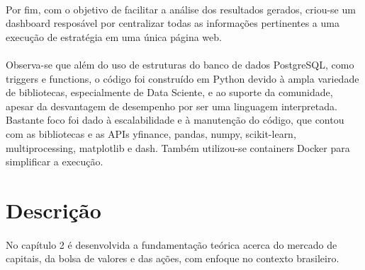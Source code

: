 \paragraph{} Por fim, com o objetivo de facilitar a análise dos resultados gerados, criou-se um dashboard resposável por centralizar todas as informações pertinentes a uma execução de estratégia em uma única página web.

\paragraph{} Observa-se que além do uso de estruturas do banco de dados PostgreSQL, como triggers e functions, o código foi construído em Python devido à ampla variedade de bibliotecas, especialmente de Data Sciente, e ao suporte da comunidade, apesar da desvantagem de desempenho por ser uma linguagem interpretada. Bastante foco foi dado à escalabilidade e à manutenção do código, que contou com as bibliotecas e as APIs yfinance, pandas, numpy, scikit-learn, multiprocessing, matplotlib e dash. Também utilizou-se containers Docker para simplificar a execução.

\section{Descrição}

\paragraph{} No capítulo 2 é desenvolvida a fundamentação teórica acerca do mercado de capitais, da bolsa de valores e das ações, com enfoque no contexto brasileiro.

